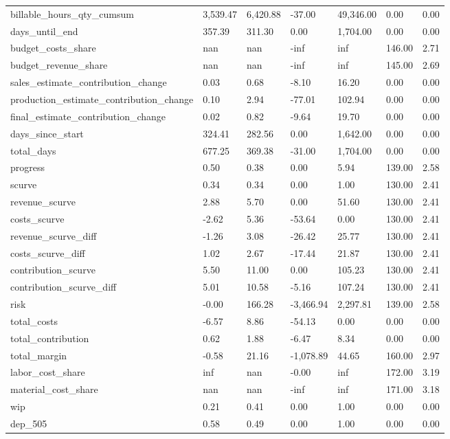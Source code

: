 \begin{landscape}
\begin{longtable}[h!]{lllllll}
billable_hours_qty_cumsum & 3,539.47 & 6,420.88 & -37.00 & 49,346.00 & 0.00 & 0.00 \\
days_until_end & 357.39 & 311.30 & 0.00 & 1,704.00 & 0.00 & 0.00 \\
budget_costs_share & nan & nan & -inf & inf & 146.00 & 2.71 \\
budget_revenue_share & nan & nan & -inf & inf & 145.00 & 2.69 \\
sales_estimate_contribution_change & 0.03 & 0.68 & -8.10 & 16.20 & 0.00 & 0.00 \\
production_estimate_contribution_change & 0.10 & 2.94 & -77.01 & 102.94 & 0.00 & 0.00 \\
final_estimate_contribution_change & 0.02 & 0.82 & -9.64 & 19.70 & 0.00 & 0.00 \\
days_since_start & 324.41 & 282.56 & 0.00 & 1,642.00 & 0.00 & 0.00 \\
total_days & 677.25 & 369.38 & -31.00 & 1,704.00 & 0.00 & 0.00 \\
progress & 0.50 & 0.38 & 0.00 & 5.94 & 139.00 & 2.58 \\
scurve & 0.34 & 0.34 & 0.00 & 1.00 & 130.00 & 2.41 \\
revenue_scurve & 2.88 & 5.70 & 0.00 & 51.60 & 130.00 & 2.41 \\
costs_scurve & -2.62 & 5.36 & -53.64 & 0.00 & 130.00 & 2.41 \\
revenue_scurve_diff & -1.26 & 3.08 & -26.42 & 25.77 & 130.00 & 2.41 \\
costs_scurve_diff & 1.02 & 2.67 & -17.44 & 21.87 & 130.00 & 2.41 \\
contribution_scurve & 5.50 & 11.00 & 0.00 & 105.23 & 130.00 & 2.41 \\
contribution_scurve_diff & 5.01 & 10.58 & -5.16 & 107.24 & 130.00 & 2.41 \\
risk & -0.00 & 166.28 & -3,466.94 & 2,297.81 & 139.00 & 2.58 \\
total_costs & -6.57 & 8.86 & -54.13 & 0.00 & 0.00 & 0.00 \\
total_contribution & 0.62 & 1.88 & -6.47 & 8.34 & 0.00 & 0.00 \\
total_margin & -0.58 & 21.16 & -1,078.89 & 44.65 & 160.00 & 2.97 \\
labor_cost_share & inf & nan & -0.00 & inf & 172.00 & 3.19 \\
material_cost_share & nan & nan & -inf & inf & 171.00 & 3.18 \\
wip & 0.21 & 0.41 & 0.00 & 1.00 & 0.00 & 0.00 \\
dep_505 & 0.58 & 0.49 & 0.00 & 1.00 & 0.00 & 0.00 \\

\end{longtable}
\end{landscape}
